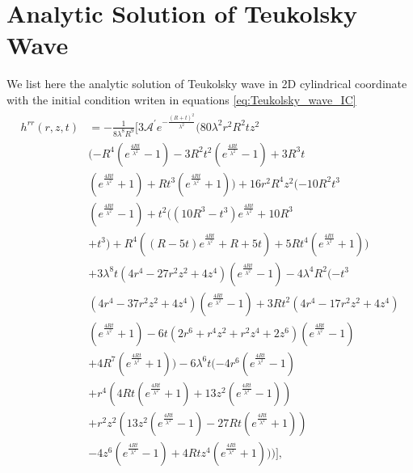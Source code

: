 
\chapter{Analytic Solution of Teukolsky Wave}
\label{A3}

We list here the analytic solution of Teukolsky wave in 2D cylindrical coordinate with the initial condition writen in equations \ref{eq:Teukolsky_wave_IC}
\begin{align}
\begin{split}
        h^{rr}(r,z,t) &=
-\frac{1}{8 \lambda ^8 R^9}\bigg[3 \mathcal{A}^\prime e^{-\frac{(R+t)^2}{\lambda ^2}} (80 \lambda ^2 r^2 R^2 t z^2 \\
& (-R^4 (e^{\frac{4 R t}{\lambda ^2}}-1)-3 R^2 t^2 (e^{\frac{4 R t}{\lambda ^2}}-1)+3 R^3 t \\
& (e^{\frac{4 R t}{\lambda ^2}}+1)+R t^3 (e^{\frac{4 R t}{\lambda ^2}}+1))+16 r^2 R^4 z^2 (-10 R^2 t^3 \\
& (e^{\frac{4 R t}{\lambda ^2}}-1)+t^2 ((10 R^3-t^3) e^{\frac{4 R t}{\lambda ^2}}+10 R^3 \\
& +t^3)+R^4 ((R-5 t) e^{\frac{4 R t}{\lambda ^2}}+R+5 t)+5 R t^4 (e^{\frac{4 R t}{\lambda ^2}}+1)) \\
& +3 \lambda ^8 t (4 r^4-27 r^2 z^2+4 z^4) (e^{\frac{4 R t}{\lambda ^2}}-1)-4 \lambda ^4 R^2 (-t^3 \\
& (4 r^4-37 r^2 z^2+4 z^4) (e^{\frac{4 R t}{\lambda ^2}}-1)+3 R t^2 (4 r^4-17 r^2 z^2+4 z^4) \\
& (e^{\frac{4 R t}{\lambda ^2}}+1)-6 t (2 r^6+r^4 z^2+r^2 z^4+2 z^6) (e^{\frac{4 R t}{\lambda ^2}}-1) \\
& +4 R^7 (e^{\frac{4 R t}{\lambda ^2}}+1))-6 \lambda ^6 t (-4 r^6 (e^{\frac{4 R t}{\lambda ^2}}-1) \\
& +r^4 (4 R t (e^{\frac{4 R t}{\lambda ^2}}+1)+13 z^2 (e^{\frac{4 R t}{\lambda ^2}}-1)) \\
& +r^2 z^2 (13 z^2 (e^{\frac{4 R t}{\lambda ^2}}-1)-27 R t (e^{\frac{4 R t}{\lambda ^2}}+1)) \\
& -4 z^6 (e^{\frac{4 R t}{\lambda ^2}}-1)+4 R t z^4 (e^{\frac{4 R t}{\lambda ^2}}+1)))\bigg],
\end{split}
\end{align}
